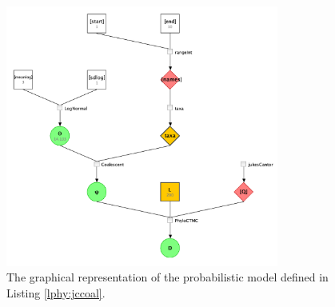 \documentclass[10pt,letterpaper,table]{article}
\begin{document}
\begin{figure}
   \includegraphics[width=0.8\textwidth]{figs_plos/jc_coal.png}
  \caption{The graphical representation of the probabilistic model defined in Listing \ref{lphy:jccoal}.} 
  \label{fig:jccoalPGM}
\end{figure}




\end{document}
